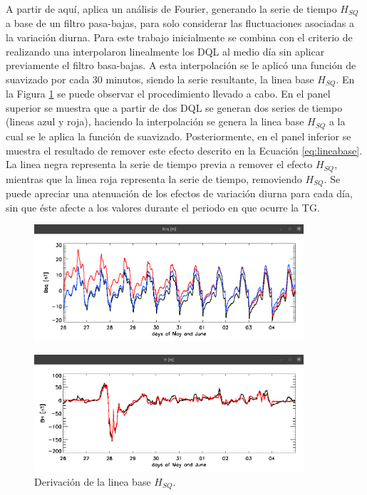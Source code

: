 A partir de aquí, \cite{vanKampt} aplica un análisis de Fourier, generando la serie de tiempo $H_{SQ}$ a base de un filtro pasa-bajas, para solo considerar las fluctuaciones asociadas a la variación diurna. Para este trabajo inicialmente se combina con el criterio de \parencite{baseline_Gjerloev} realizando una interpolaron linealmente los DQL al medio día sin aplicar previamente el filtro basa-bajas. A esta interpolación se le aplicó una función de suavizado por cada 30 minutos, siendo la serie resultante, la linea base $H_{SQ}$. En la Figura \ref{fig:diasq} se puede observar el procedimiento llevado a cabo. En el panel superior se muestra que a partir de dos DQL se generan dos series de tiempo (lineas azul y roja), haciendo la interpolación se genera la linea base $H_{SQ}$ a la cual se le aplica la función de suavizado. Posteriormente, en el panel inferior se muestra el resultado de remover este efecto descrito en la Ecuación \ref{eq:lineabase}. La linea negra representa la serie de tiempo previa a remover el efecto $H_{SQ}$, mientras que la linea roja representa la serie de tiempo, removiendo $H_{SQ}$. Se puede apreciar una atenuación de los efectos de variación diurna para cada día, sin que éste afecte a los valores durante el periodo en que ocurre la TG.
\vspace{1 em}


\begin{figure}[h!]
    \centering
    \centerline{\Large \bf   
         \hfill}
          \centerline{\Large \bf   
         \hfill}
     \includegraphics[width=10.0cm]{Images/cap2/lineabase/diurno/sq.png}
     \centerline{\Large \bf   
         \hfill}
     \includegraphics[width=10.0cm]{Images/cap2/lineabase/diurno/sq2.png}            
       \caption{Derivación de la linea base $H_{SQ}$.}
    \label{fig:diasq}
\end{figure}


